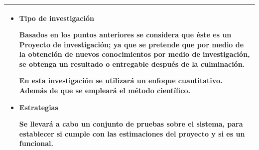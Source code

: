 \documentclass[letter,12pt]{article}
\begin{document}
\begin{center}
\begin{tabular}{|p{15.5cm}|}
\hline
    
    \begin{itemize}
        
        \item Tipo de investigación
        
        Basados en los puntos anteriores se considera que éste es un Proyecto de investigación; ya que se pretende que por medio de la obtención de nuevos conocimientos por medio de investigación, se obtenga un resultado o entregable después de la culminación. 
    
        En esta investigación se utilizará un enfoque cuantitativo. Además de que se empleará el método científico.
        
        \item Estrategias
        
        Se llevará a cabo un conjunto de pruebas sobre el sistema, para establecer si cumple con las estimaciones del proyecto y si es un funcional.
    \end{itemize}\\  

\hline
\end{tabular}
\end{center}

\end{document}
